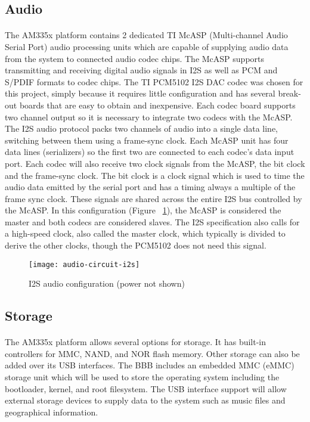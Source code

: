 \subsection{Audio}

\paragraph{}
The AM335x platform contains 2 dedicated TI McASP (Multi-channel Audio Serial Port) audio processing units which are capable of supplying audio data from the system to connected audio codec chips.
The McASP supports transmitting and receiving digital audio signals in I2S as well as PCM and S/PDIF formats to codec chips.
The TI PCM5102 I2S DAC codec was chosen for this project, simply because it requires little configuration and has several break-out boards that are easy to obtain and inexpensive.
Each codec board supports two channel output so it is necessary to integrate two codecs with the McASP.
The I2S audio protocol packs two channels of audio into a single data line, switching between them using a frame-sync clock.
Each McASP unit has four data lines (serializers) so the first two are connected to each codec's data input port.
Each codec will also receive two clock signals from the McASP, the bit clock and the frame-sync clock.
The bit clock is a clock signal which is used to time the audio data emitted by the serial port and has a timing always a multiple of the frame sync clock.
These signals are shared across the entire I2S bus controlled by the McASP.
In this configuration (Figure ~\ref{fig:audio-circuit-i2s}), the McASP is considered the master and both codecs are considered slaves.
The I2S specification also calls for a high-speed clock, also called the master clock, which typically is divided to derive the other clocks, though the PCM5102 does not need this signal.

\begin{figure}
  \centering
  \texttt{[image: audio-circuit-i2s]}
  \caption{I2S audio configuration (power not shown)}
  \label{fig:audio-circuit-i2s}
\end{figure}

\subsection{Storage}

\paragraph{}
The AM335x platform allows several options for storage.
It has built-in controllers for MMC, NAND, and NOR flash memory.
Other storage can also be added over its USB interfaces.
The BBB includes an embedded MMC (eMMC) storage unit which will be used to store the operating system including the bootloader, kernel, and root filesystem.
The USB interface support will allow external storage devices to supply data to the system such as music files and geographical information.

